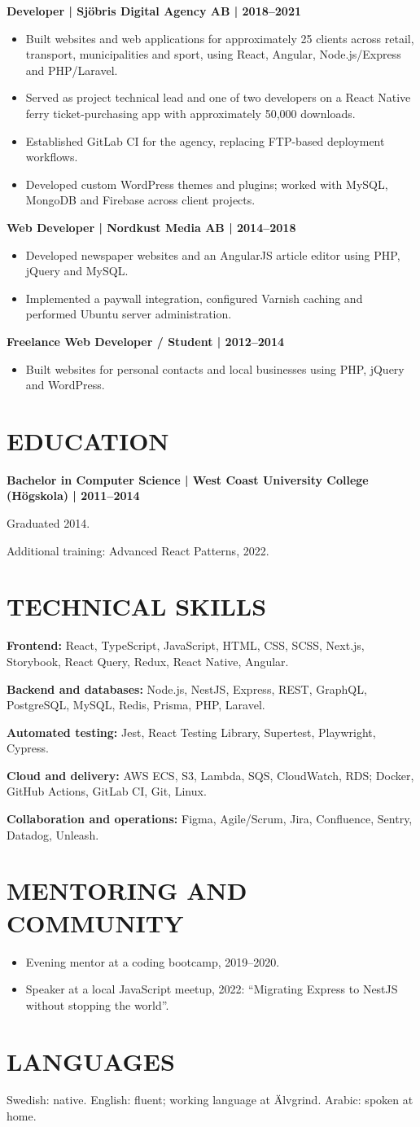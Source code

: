 \documentclass[11pt,a4paper]{article}
\newcommand{\cvsection}[1]{\section*{#1}}
\newcommand{\cvrole}[1]{\par\noindent\textbf{#1}\par}
\begin{document}
\cvrole{Developer | Sjöbris Digital Agency AB | 2018–2021}
\begin{itemize}
\item Built websites and web applications for approximately 25 clients across retail, transport, municipalities and sport, using React, Angular, Node.js/Express and PHP/Laravel.
\item Served as project technical lead and one of two developers on a React Native ferry ticket-purchasing app with approximately 50,000 downloads.
\item Established GitLab CI for the agency, replacing FTP-based deployment workflows.
\item Developed custom WordPress themes and plugins; worked with MySQL, MongoDB and Firebase across client projects.
\end{itemize}

\cvrole{Web Developer | Nordkust Media AB | 2014–2018}
\begin{itemize}
\item Developed newspaper websites and an AngularJS article editor using PHP, jQuery and MySQL.
\item Implemented a paywall integration, configured Varnish caching and performed Ubuntu server administration.
\end{itemize}

\cvrole{Freelance Web Developer / Student | 2012–2014}
\begin{itemize}
\item Built websites for personal contacts and local businesses using PHP, jQuery and WordPress.
\end{itemize}

\cvsection{EDUCATION}
\textbf{Bachelor in Computer Science | West Coast University College (Högskola) | 2011–2014}\par
Graduated 2014.\par
Additional training: Advanced React Patterns, 2022.

\cvsection{TECHNICAL SKILLS}
\textbf{Frontend:} React, TypeScript, JavaScript, HTML, CSS, SCSS, Next.js, Storybook, React Query, Redux, React Native, Angular.\par
\textbf{Backend and databases:} Node.js, NestJS, Express, REST, GraphQL, PostgreSQL, MySQL, Redis, Prisma, PHP, Laravel.\par
\textbf{Automated testing:} Jest, React Testing Library, Supertest, Playwright, Cypress.\par
\textbf{Cloud and delivery:} AWS ECS, S3, Lambda, SQS, CloudWatch, RDS; Docker, GitHub Actions, GitLab CI, Git, Linux.\par
\textbf{Collaboration and operations:} Figma, Agile/Scrum, Jira, Confluence, Sentry, Datadog, Unleash.

\cvsection{MENTORING AND COMMUNITY}
\begin{itemize}
\item Evening mentor at a coding bootcamp, 2019–2020.
\item Speaker at a local JavaScript meetup, 2022: “Migrating Express to NestJS without stopping the world”.
\end{itemize}

\cvsection{LANGUAGES}
Swedish: native. English: fluent; working language at Älvgrind. Arabic: spoken at home.
\end{document}
